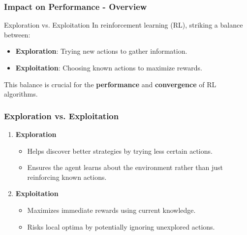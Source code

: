 \documentclass[aspectratio=169]{beamer}
\begin{document}
\begin{frame}[fragile]
    \frametitle{Impact on Performance - Overview}
    \begin{block}{Exploration vs. Exploitation}
        In reinforcement learning (RL), striking a balance between:
        \begin{itemize}
            \item \textbf{Exploration}: Trying new actions to gather information.
            \item \textbf{Exploitation}: Choosing known actions to maximize rewards.
        \end{itemize}
    \end{block}
    This balance is crucial for the \textbf{performance} and \textbf{convergence} of RL algorithms.
\end{frame}

\begin{frame}[fragile]
    \frametitle{Exploration vs. Exploitation}
    \begin{enumerate}
        \item \textbf{Exploration}
            \begin{itemize}
                \item Helps discover better strategies by trying less certain actions.
                \item Ensures the agent learns about the environment rather than just reinforcing known actions.
            \end{itemize}
        \item \textbf{Exploitation}
            \begin{itemize}
                \item Maximizes immediate rewards using current knowledge.
                \item Risks local optima by potentially ignoring unexplored actions.
            \end{itemize}
    \end{enumerate}
\end{frame}
\end{document}
